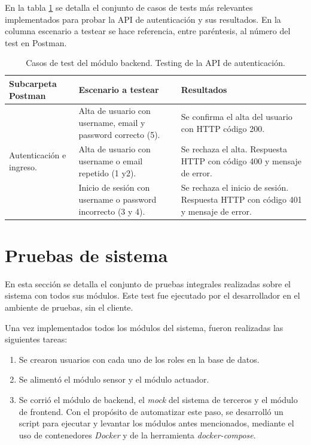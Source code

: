 \pagebreak
En la tabla  \ref{tab:tablaTestBackendAutenticacion} se detalla el conjunto de casos de tests más relevantes implementados para probar la API de autenticación y sus resultados. En la columna escenario a testear se hace referencia, entre paréntesis, al número del test en Postman.


\begin{table}[h]
	\centering
	\caption[Tipos de pruebas backend]{Casos de test del módulo backend. Testing de la API de autenticación.}
	\begin{tabular}{p{3.5cm} p{4.5cm} p{4cm}} 	

		\toprule
		\textbf{Subcarpeta Postman} & 
		\textbf{Escenario a testear} &
		\textbf{Resultados} 
		\\
		\midrule
\multirow{3}{3.5cm}{Autenticación e ingreso.} & Alta de usuario con username, email y password correcto (5). & Se confirma el alta del usuario con HTTP código 200. \\
                    & Alta de usuario con username o email repetido (1 y2). & Se rechaza el alta. Respuesta HTTP con código 400 y mensaje de error. \\
                    & Inicio de sesión con username o password incorrecto (3 y 4). & Se rechaza el inicio de sesión. Respuesta HTTP con código 401 y mensaje de error. \\
		\bottomrule
		\hline
	\end{tabular}
	\label{tab:tablaTestBackendAutenticacion}
\end{table}


\section{Pruebas de sistema}

En esta sección se detalla el conjunto de pruebas integrales realizadas sobre el sistema con todos sus módulos. Este test fue ejecutado por el desarrollador en el ambiente de pruebas, sin el cliente.

Una vez implementados todos los módulos del sistema, fueron realizadas las siguientes tareas:

\begin{enumerate}
\item Se crearon usuarios con cada uno de los roles en la base de datos.
\item Se alimentó el módulo sensor y el módulo actuador.
\item Se corrió el módulo de backend, el \textit{mock} del sistema de terceros y el módulo de frontend. Con el propósito de automatizar este paso, se desarrolló un script para ejecutar y levantar los módulos antes mencionados, mediante el uso de contenedores \textit{Docker} y de la herramienta \textit{docker-compose}. 

\end{enumerate}

